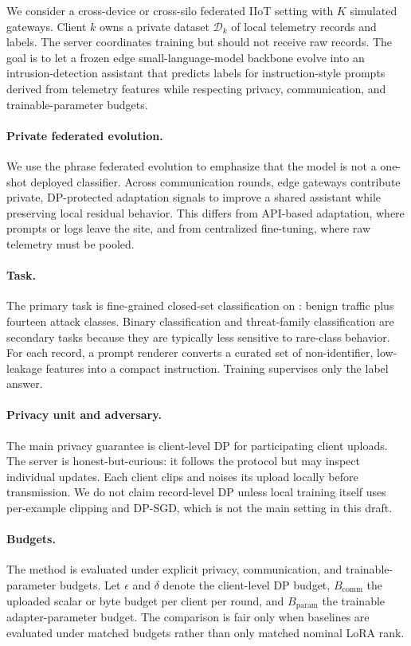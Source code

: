 We consider a cross-device or cross-silo federated IIoT setting with $K$ simulated gateways. Client $k$ owns a private dataset $\mathcal{D}_k$ of local telemetry records and labels. The server coordinates training but should not receive raw records. The goal is to let a frozen edge small-language-model backbone evolve into an intrusion-detection assistant that predicts labels for instruction-style prompts derived from telemetry features while respecting privacy, communication, and trainable-parameter budgets.

\paragraph{Private federated evolution.}
We use the phrase federated evolution to emphasize that the model is not a one-shot deployed classifier. Across communication rounds, edge gateways contribute private, DP-protected adaptation signals to improve a shared assistant while preserving local residual behavior. This differs from API-based adaptation, where prompts or logs leave the site, and from centralized fine-tuning, where raw telemetry must be pooled.

\paragraph{Task.}
The primary task is fine-grained closed-set classification on \dataset: benign traffic plus fourteen attack classes. Binary classification and threat-family classification are secondary tasks because they are typically less sensitive to rare-class behavior. For each record, a prompt renderer converts a curated set of non-identifier, low-leakage features into a compact instruction. Training supervises only the label answer.

\paragraph{Privacy unit and adversary.}
The main privacy guarantee is client-level DP for participating client uploads. The server is honest-but-curious: it follows the protocol but may inspect individual updates. Each client clips and noises its upload locally before transmission. We do not claim record-level DP unless local training itself uses per-example clipping and DP-SGD, which is not the main setting in this draft.

\paragraph{Budgets.}
The method is evaluated under explicit privacy, communication, and trainable-parameter budgets. Let $\epsilon$ and $\delta$ denote the client-level DP budget, $B_{\mathrm{comm}}$ the uploaded scalar or byte budget per client per round, and $B_{\mathrm{param}}$ the trainable adapter-parameter budget. The comparison is fair only when baselines are evaluated under matched budgets rather than only matched nominal LoRA rank.
